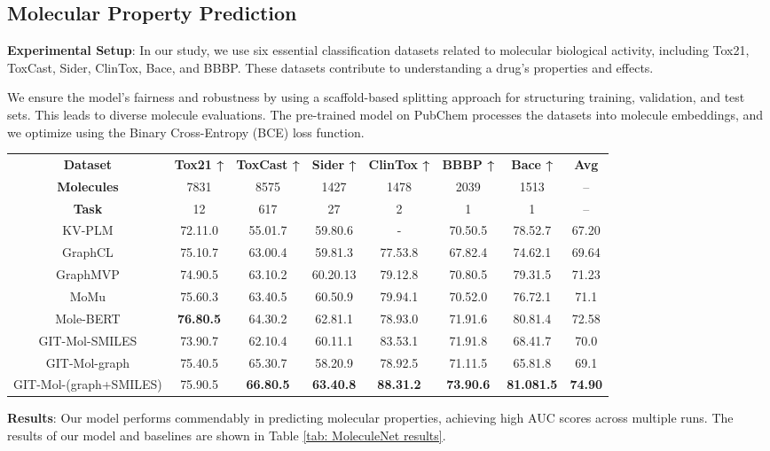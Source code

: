 \documentclass{article}
\begin{document}
\subsection{Molecular Property Prediction}

\textbf{Experimental Setup}: In our study, we use six essential classification datasets related to molecular biological activity, including Tox21, ToxCast, Sider, ClinTox, Bace, and BBBP. These datasets contribute to understanding a drug's properties and effects.

We ensure the model's fairness and robustness by using a scaffold-based splitting approach for structuring training, validation, and test sets. This leads to diverse molecule evaluations. The pre-trained model on PubChem processes the datasets into molecule embeddings, and we optimize using the Binary Cross-Entropy (BCE) loss function.
\begin{table*}[t]
	\centering
    \caption{ \textbf{Results for molecular property prediction (classification)}. The combined use of \textbf{SMILES} and \textbf{2D graphs} enhances our multi-modal molecular representation, which outperforms both single-modal models and other multi-modal approaches.}
    \label{tab: MoleculeNet results} 
	\begin{tabular}{c|c|c|c|c|c|c|c}
	\hline
	\textbf{Dataset} & \textbf{Tox21 ↑} & \textbf{ToxCast ↑} & \textbf{Sider ↑} & \textbf{ClinTox ↑} & \textbf{BBBP ↑}& \textbf{Bace ↑}&\textbf{Avg}\\
        \textbf{Molecules} & 7831 & 8575 & 1427 & 1478 & 2039& 1513&--\\
        \textbf{Task} & 12 & 617 & 27 & 2 & 1& 1&--\\
		\hline
        KV-PLM & 72.11.0 & 55.01.7 & 59.80.6 & - & 70.50.5 & 78.52.7 
        & 67.20  \\
        GraphCL & 75.10.7 & 63.00.4 & 59.81.3 & 77.53.8 & 67.82.4 & 74.62.1
        & 69.64 \\
        GraphMVP & 74.90.5 & 63.10.2 & 60.20.13 & 79.12.8 & 70.80.5 & 79.31.5
        & 71.23 \\
        MoMu & 75.60.3 & 63.40.5 & 60.50.9 & 79.94.1 & 70.52.0 & 76.72.1
        & 71.1 \\
        Mole-BERT & \textbf{76.80.5 }& 64.30.2 & 62.81.1 & 78.93.0 
        & 71.91.6 & 80.81.4 &72.58 \\
        \hline
        GIT-Mol-SMILES & 73.90.7 & 62.10.4 & 60.11.1 & 83.53.1 & 71.91.8 & 68.41.7 & 70.0 \\
        GIT-Mol-graph & 75.40.5 & 65.30.7 & 58.20.9 & 78.92.5 & 71.11.5 & 
        65.81.8 & 69.1 \\
        GIT-Mol-(graph+SMILES) & 75.90.5 &\textbf{66.80.5} & \textbf{63.40.8} & 
        \textbf{88.31.2}& 
        \textbf{73.90.6} & 
        \textbf{81.081.5} & 
        \textbf{74.90} \\
		\hline
	\end{tabular}
\end{table*}
\textbf{Results}: Our model performs commendably in predicting molecular properties, achieving high AUC scores across multiple runs. The results of our model and baselines are shown in Table \ref{tab: MoleculeNet results}. 
\end{document}
